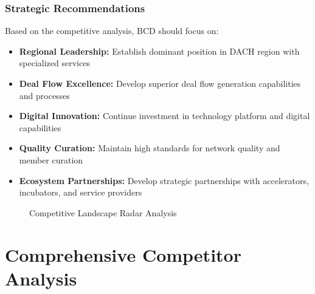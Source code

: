 \subsubsection{Strategic Recommendations}
Based on the competitive analysis, BCD should focus on:
\begin{itemize}
    \item \textbf{Regional Leadership:} Establish dominant position in DACH region with specialized services
    \item \textbf{Deal Flow Excellence:} Develop superior deal flow generation capabilities and processes
    \item \textbf{Digital Innovation:} Continue investment in technology platform and digital capabilities
    \item \textbf{Quality Curation:} Maintain high standards for network quality and member curation
    \item \textbf{Ecosystem Partnerships:} Develop strategic partnerships with accelerators, incubators, and service providers
\end{itemize}

\begin{figure}[h]
\centering
{}
\caption{Competitive Landscape Radar Analysis}
\label{fig:competitive-radar}
\end{figure}

\section{Comprehensive Competitor Analysis}

